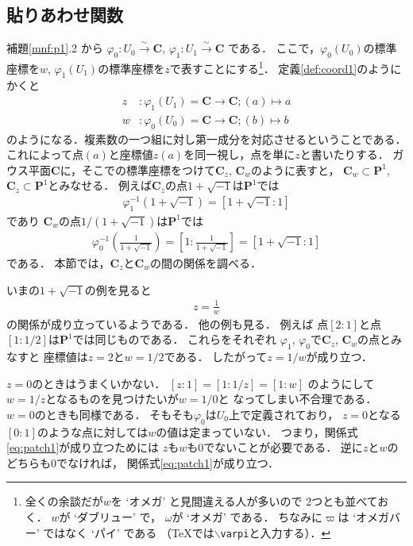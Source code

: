 \documentclass[11pt, a4paper, dvipdfmx, draft]{jsarticle}
\theoremstyle{definition}
\newcommand{\cc}{\mathbf{C}}
\newcommand{\pp}{\mathbf{P}}
\newcommand{\pphi}{\varphi} %
\newcommand{\isom}{\overset{\sim}{\longrightarrow}}
\theoremstyle{mystyle}
\numberwithin{equation}{section} %
\begin{document}
\subsection{貼りあわせ関数}\label{ssec:patch}

補題\ref{mnf:p1}.2 から
$\pphi_0 \colon U_0\isom\cc$, $\pphi_1\colon {U_1} \isom\cc$
である．
ここで，$\pphi_0(U_0)$の標準座標を$w$, 
$\pphi_1(U_1)$の標準座標を$z$で表すことにする\footnote{
    全くの余談だが$w$を `オメガ' と見間違える人が多いので
    2つとも並べておく．
    $w$が `ダブリュー' で，
    $\omega$が `オメガ' である．
    ちなみに$\varpi$は `オメガバー' ではなく `パイ' である
    （\TeX では\texttt{$\backslash$varpi}と入力する）．}．
定義\ref{def:coord1}のようにかくと
\begin{align*}
    z&\colon \pphi_1(U_1)= \cc \to \cc; (a)\mapsto a\\
    w&\colon \pphi_0(U_0)= \cc \to \cc; (b)\mapsto b
\end{align*}
のようになる．複素数の一つ組に対し第一成分を対応させるということである．
これによって点$(a)$と座標値$z(a)$を同一視し，点を単に$z$と書いたりする．
ガウス平面$\cc$に，そこでの標準座標をつけて$\cc_z$, $\cc_w$のように表すと，
$\cc_w\subset\pp^1$, $\cc_z\subset\pp^1$とみなせる．
例えば$\cc_z$の点$1+\sqrt{-1}$は$\pp^1$では
\begin{align*}
    \pphi_1^{-1}\left(1+\sqrt{-1}\right)=\left[1+\sqrt{-1}\colon 1\right]    
\end{align*}
であり
$\cc_w$の点$1/(1+\sqrt{-1})$は$\pp^1$では
\begin{align*}
    \pphi_0^{-1}\left(\frac{1}{1+\sqrt{-1}}\right)
    =\left[1\colon \frac{1}{1+\sqrt{-1}}\right]
    =\left[1+\sqrt{-1}\colon 1\right]        
\end{align*}
である．
本節では，$\cc_z$と$\cc_w$の間の関係を調べる．

いまの$1+\sqrt{-1}$の例を見ると
\begin{align}\label{eq:patch1}
    z=\frac{1}{w}
\end{align}
の関係が成り立っているようである．
他の例も見る．
例えば
点$[2\colon 1]$と点$[1\colon 1/2]$は$\pp^1$では同じものである．
これらをそれぞれ
$\pphi_1$, $\pphi_0$で$\cc_z$, $\cc_w$の点とみなすと
座標値は$z=2$と$w=1/2$である．
したがって$z=1/w$が成り立つ．

$z=0$のときはうまくいかない．
$[z\colon 1] = [1\colon 1/z] = [1\colon w]$
のようにして$w=1/z$となるものを見つけたいが$w=1/0$と
なってしまい不合理である．
$w=0$のときも同様である．
そもそも$\pphi_0$は$U_0$上で定義されており，
$z=0$となる$[0\colon 1]$のような点に対しては$w$の値は定まっていない．
つまり，関係式\eqref{eq:patch1}が成り立つためには
$z$も$w$も0でないことが必要である．
逆に$z$と$w$のどちらも0でなければ，
関係式\eqref{eq:patch1}が成り立つ．
\end{document}
